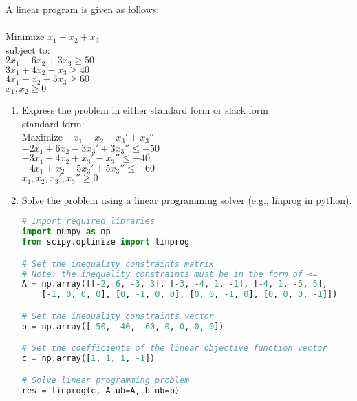 \documentclass[12pt]{article}
\newenvironment{problem}[2][Problem]{\begin{trivlist}
\item[\hskip \labelsep {\bfseries #1}\hskip \labelsep {\bfseries #2.}]}{\end{trivlist}}
\begin{document}
\begin{problem}{3}
    A linear program is given as follows:\\\\
    Minimize $x_1+x_2+x_3$\\
subject to:\\
$2x_1 - 6x_2 + 3x_3 \geq 50$\\
$3x_1 + 4x_2 -x_3 \geq 40$\\
$4x_1 - x_2 + 5x_3 \geq 60$\\
$x_1, x_2 \geq 0$

\begin{enumerate}[label=(\alph*)]
    \item  Express the problem in either standard form or slack form\\
    standard form:\\
    Maximize $-x_1 - x_2 - x_3' + x_3''$\\
    $-2x_1 + 6x_2 - 3x_3' + 3x_3'' \leq -50$\\
    $-3x_1 - 4x_2 + x_3' - x_3'' \leq -40$\\
    $-4x_1 + x_2 - 5x_3' + 5x_3'' \leq -60$\\
    $x_1, x_2, x_3', x_3'' \geq 0$
    \item Solve the problem using a linear programming solver (e.g., linprog in python).
    \begin{lstlisting}[language=Python, caption=homework4.py]
# Import required libraries
import numpy as np
from scipy.optimize import linprog

# Set the inequality constraints matrix
# Note: the inequality constraints must be in the form of <=
A = np.array([[-2, 6, -3, 3], [-3, -4, 1, -1], [-4, 1, -5, 5],
    [-1, 0, 0, 0], [0, -1, 0, 0], [0, 0, -1, 0], [0, 0, 0, -1]])

# Set the inequality constraints vector
b = np.array([-50, -40, -60, 0, 0, 0, 0])

# Set the coefficients of the linear objective function vector
c = np.array([1, 1, 1, -1])

# Solve linear programming problem
res = linprog(c, A_ub=A, b_ub=b)


\end{lstlisting}
\end{enumerate}
\end{problem}
\end{document}
